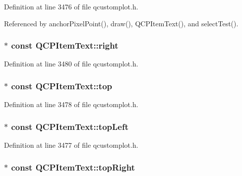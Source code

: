Definition at line 3476 of file qcustomplot.\+h.



Referenced by anchor\+Pixel\+Point(), draw(), Q\+C\+P\+Item\+Text(), and select\+Test().

\hypertarget{class_q_c_p_item_text_aef159622ce6502412e782a21ba6d84f2}{}
\subsubsection[{right}]{$\ast$ const Q\+C\+P\+Item\+Text\+::right}\label{class_q_c_p_item_text_aef159622ce6502412e782a21ba6d84f2}


Definition at line 3480 of file qcustomplot.\+h.

\hypertarget{class_q_c_p_item_text_a5c87ee162cbbe3d166b97826c8849304}{}
\subsubsection[{top}]{$\ast$ const Q\+C\+P\+Item\+Text\+::top}\label{class_q_c_p_item_text_a5c87ee162cbbe3d166b97826c8849304}


Definition at line 3478 of file qcustomplot.\+h.

\hypertarget{class_q_c_p_item_text_a6354d8762182a3502103fabe5fbb8512}{}
\subsubsection[{top\+Left}]{$\ast$ const Q\+C\+P\+Item\+Text\+::top\+Left}\label{class_q_c_p_item_text_a6354d8762182a3502103fabe5fbb8512}


Definition at line 3477 of file qcustomplot.\+h.

\hypertarget{class_q_c_p_item_text_ad18ac45cb4cc135de1eb78f2e86b6504}{}
\subsubsection[{top\+Right}]{$\ast$ const Q\+C\+P\+Item\+Text\+::top\+Right}\label{class_q_c_p_item_text_ad18ac45cb4cc135de1eb78f2e86b6504}


